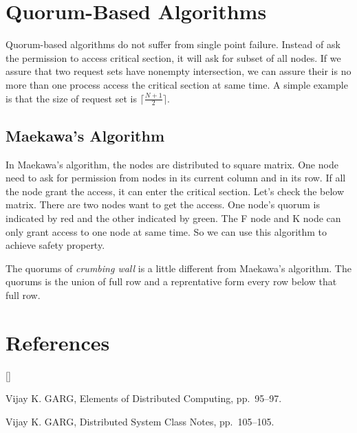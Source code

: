 \documentclass[twoside]{article}
\def\beginrefs{\begin{list}%
        {[\arabic{equation}]}{\usecounter{equation}
         \setlength{\leftmargin}{2.0truecm}\setlength{\labelsep}{0.4truecm}%
         \setlength{\labelwidth}{1.6truecm}}}
\def\endrefs{\end{list}}
\def\bibentry#1{\item[\hbox{[#1]}]}
\begin{document}
\section{Quorum-Based Algorithms}
Quorum-based algorithms do not suffer from single point failure. Instead of ask the permission
to access critical section, it will ask for subset of all nodes. If we assure that two
request sets have nonempty intersection, we can assure their is no more than one
process access the critical section at same time. A simple example is that the
size of request set is $\lceil\frac{N+1}{2}\rceil$.

\subsection{Maekawa's Algorithm}
In Maekawa's algorithm, the nodes are distributed to square matrix. One node need
to ask for permission from nodes in its current column and in its row. If all the
node grant the access, it can enter the critical section. Let's check the below matrix.
There are two nodes want to get the access. One node's quorum is indicated by red and the 
other indicated by green. The F node and K node can only grant access to one node
at same time. So we can use this algorithm to achieve safety property.



The quorums of {\it crumbing wall} is a little different from Maekawa's algorithm.
The quorums is the union of full row and a reprentative form every row below that
full row.


\section*{References}
\beginrefs
\bibentry{GARG02}{\sc Vijay K. GARG},
Elements of Distributed Computing,
pp.~95--97.
\bibentry{GARG17}{\sc Vijay K. GARG},
Distributed System Class Notes,
pp.~105--105.

\endrefs
\end{document}
